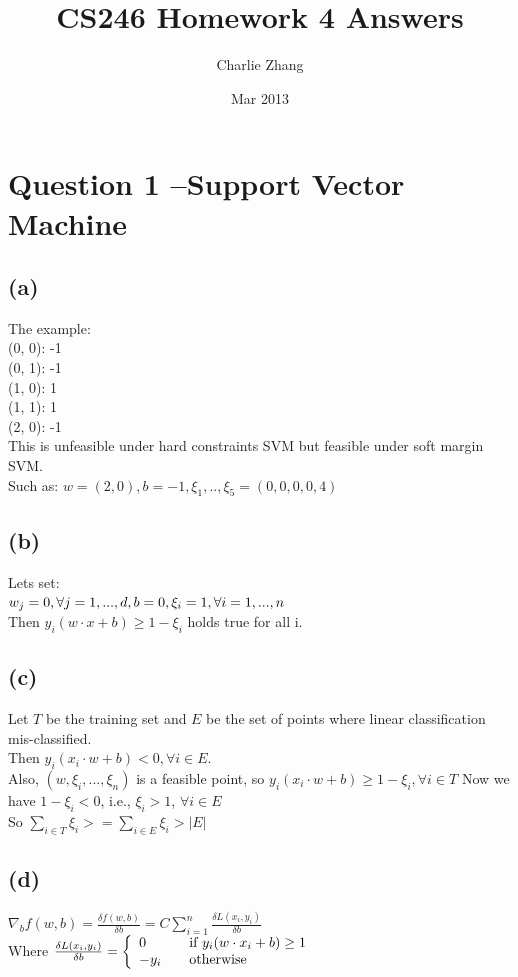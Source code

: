 \documentclass{article}
\title{CS246 Homework 4 Answers}
\author{Charlie Zhang}
\date{Mar 2013}
\begin{document}
\maketitle
\section{Question 1 --Support Vector Machine}


\subsection{(a)}
The example:\\
(0, 0): -1 \\
(0, 1): -1 \\
(1, 0): 1 \\
(1, 1): 1 \\
(2, 0): -1 \\
This is unfeasible under hard constraints SVM but feasible under soft margin SVM. \\
Such as: $w = (2, 0), b = -1, \xi_1, .., \xi_5 = (0, 0, 0, 0, 4)$

\subsection{(b)}
Lets set: \\
$w_j = 0, \forall j = 1, ..., d, \\
 b = 0, \\
 \xi_i =  1, \forall i = 1, ..., n$ \\
 Then $y_i(w\cdot x + b) \ge 1 - \xi_i$ holds true for all i.

\subsection{(c)}
Let $T$ be the training set and $E$ be the set of points where linear classification mis-classified. \\
Then $y_i(x_i\cdot w + b) < 0, \forall i \in E$. \\
Also, $(w, \xi_i, ..., \xi_n)$ is a feasible point, so $y_i(x_i\cdot w + b) \ge 1 - \xi_i, \forall i \in T$
Now we have $1 - \xi_i < 0$, i.e., $\xi_i > 1$, $\forall i \in E$\\
So $\sum\limits_{i\in T}\xi_i >= \sum\limits_{i\in E}\xi_i > |E|$\\

\subsection{(d)}
$\nabla_b  f(w, b) = \frac{\delta f(w, b)}{\delta b} = C\sum\limits_{i=1}^{n}\frac{\delta L(x_i, y_i)}{\delta b}$ \\
Where $\frac{\delta L(x_i, y_i)}{\delta b} = \left\{ 
  \begin{array}{l l}
    0 & \quad \text{if $y_i(w\cdot x_i+b)\ge 1$}\\
    -y_i & \quad \text{otherwise}
  \end{array} \right. $
\end{document}
